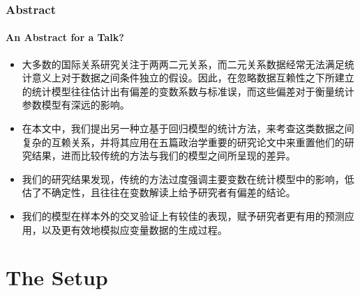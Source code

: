 \documentclass[10pt, compress]{beamer}
\begin{document}
\begin{frame}
\frametitle{Abstract}
\framesubtitle{An Abstract for a Talk?}
\begin{itemize}
\item 大多数的国际关系研究关注于两两二元关系，而二元关系数据经常无法满足统计意义上对于数据之间条件独立的假设。因此，在忽略数据互赖性之下所建立的统计模型往往估计出有偏差的变数系数与标准误，而这些偏差对于衡量统计参数模型有深远的影响。 

\item 在本文中，我们提出另一种立基于回归模型的统计方法，来考查这类数据之间复杂的互赖关系，并将其应用在五篇政治学重要的研究论文中来重置他们的研究结果，进而比较传统的方法与我们的模型之间所呈现的差异。 

\item 我们的研究结果发现，传统的方法过度强调主要变数在统计模型中的影响，低估了不确定性，且往往在变数解读上给予研究者有偏差的结论。

\item 我们的模型在样本外的交叉验证上有较佳的表现，赋予研究者更有用的预测应用，以及更有效地模拟应变量数据的生成过程。
\end{itemize}
\end{frame}



\section{The Setup}
\end{document}
